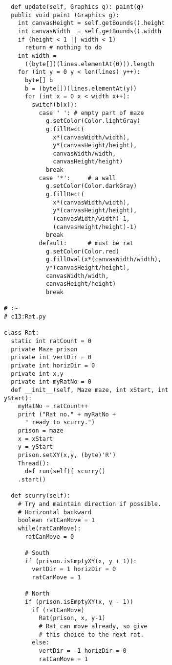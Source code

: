 \begin{lstlisting}
  def update(self, Graphics g): paint(g)  
  public void paint (Graphics g): 
    int canvasHeight = self.getBounds().height 
    int canvasWidth  = self.getBounds().width 
    if (height < 1 || width < 1)  
      return # nothing to do  
    int width =  
      ((byte[])(lines.elementAt(0))).length 
    for (int y = 0 y < len(lines) y++): 
      byte[] b 
      b = (byte[])(lines.elementAt(y)) 
      for (int x = 0 x < width x++): 
        switch(b[x]): 
          case ' ': # empty part of maze 
            g.setColor(Color.lightGray) 
            g.fillRect( 
              x*(canvasWidth/width), 
              y*(canvasHeight/height), 
              canvasWidth/width, 
              canvasHeight/height) 
            break 
          case '*':     # a wall  
            g.setColor(Color.darkGray) 
            g.fillRect( 
              x*(canvasWidth/width), 
              y*(canvasHeight/height), 
              (canvasWidth/width)-1, 
              (canvasHeight/height)-1) 
            break 
          default:      # must be rat 
            g.setColor(Color.red) 
            g.fillOval(x*(canvasWidth/width), 
            y*(canvasHeight/height), 
            canvasWidth/width, 
            canvasHeight/height) 
            break              
            
# :~ 
# c13:Rat.py 

class Rat: 
  static int ratCount = 0 
  private Maze prison 
  private int vertDir = 0  
  private int horizDir = 0 
  private int x,y 
  private int myRatNo = 0 
  def __init__(self, Maze maze, int xStart, int 
yStart): 
    myRatNo = ratCount++ 
    print ("Rat no." + myRatNo +  
      " ready to scurry.") 
    prison = maze 
    x = xStart 
    y = yStart 
    prison.setXY(x,y, (byte)'R') 
    Thread(): 
      def run(self){ scurry()  
    .start() 
    
  def scurry(self): 
    # Try and maintain direction if possible. 
    # Horizontal backward 
    boolean ratCanMove = 1 
    while(ratCanMove): 
      ratCanMove = 0 
      
      # South  
      if (prison.isEmptyXY(x, y + 1)): 
        vertDir = 1 horizDir = 0          
        ratCanMove = 1
        
      # North 
      if (prison.isEmptyXY(x, y - 1)) 
        if (ratCanMove) 
          Rat(prison, x, y-1) 
          # Rat can move already, so give  
          # this choice to the next rat. 
        else: 
          vertDir = -1 horizDir = 0          
          ratCanMove = 1 
          

\end{lstlisting}
